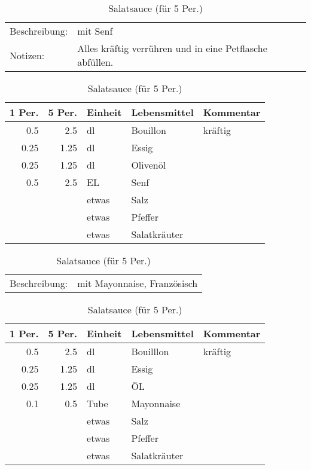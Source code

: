 \documentclass[11pt,a4paper]{article}%
\begin{document}
%
\vspace{0.75cm}%
\renewcommand{\arraystretch}{1.25}%


\begin{table}[h]%
\caption{Salatsauce (für 5 Per.)}%
\begin{tabularx}{\textwidth}{l X}%
Beschreibung: &mit Senf\\%
Notizen:&Alles kräftig verrühren und in eine Petflasche abfüllen.\\%
\end{tabularx}%
\par%
\begin{tabularx}{\textwidth}{| r | r | l | l | X |}%
\hline%
\tiny{1 Per.}&\tiny{5 Per.}&\tiny{Einheit}&\tiny{Lebensmittel}&\tiny{Kommentar}\\%
\hline%
0.5&2.5&dl&Bouillon&kräftig\\%
\hline%
0.25&1.25&dl&Essig&\\%
\hline%
0.25&1.25&dl&Olivenöl&\\%
\hline%
0.5&2.5&EL&Senf&\\%
\hline%
&&etwas&Salz&\\%
\hline%
&&etwas&Pfeffer&\\%
\hline%
&&etwas&Salatkräuter&\\%
\hline%
\end{tabularx}%
\end{table}

%
\vspace{0.75cm}%
\renewcommand{\arraystretch}{1.25}%


\begin{table}[h]%
\caption{Salatsauce (für 5 Per.)}%
\begin{tabularx}{\textwidth}{l X}%
Beschreibung: & mit Mayonnaise, Französisch\\%
\end{tabularx}%
\par%
\begin{tabularx}{\textwidth}{| r | r | l | l | X |}%
\hline%
\tiny{1 Per.}&\tiny{5 Per.}&\tiny{Einheit}&\tiny{Lebensmittel}&\tiny{Kommentar}\\%
\hline%
0.5&2.5&dl&Bouilllon&kräftig\\%
\hline%
0.25&1.25&dl&Essig&\\%
\hline%
0.25&1.25&dl&ÖL&\\%
\hline%
0.1&0.5&Tube&Mayonnaise&\\%
\hline%
&&etwas&Salz&\\%
\hline%
&&etwas&Pfeffer&\\%
\hline%
&&etwas&Salatkräuter&\\%
\hline%
\end{tabularx}%
\end{table}
\end{document}
